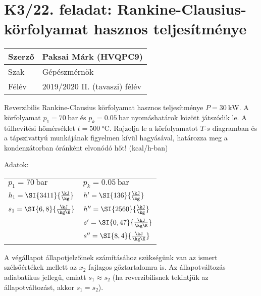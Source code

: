 \section*{K3/22. feladat: Rankine-Clausius-körfolyamat hasznos teljesítménye}


\begin{tabular}{ | p{2cm} | p{14cm} | } 
	\hline
	Szerző & Paksai Márk (HVQPC9)\\ 
	\hline
	Szak & Gépészmérnök \\ 
	\hline
	Félév & 2019/2020 II. (tavaszi) félév \\ 
	\hline
\end{tabular}
\vspace{0.5cm}

 Reverzibilis Rankine-Clausius körfolyamat hasznos teljesítménye $P = \SI{30}{\kW}$. A körfolyamat $p_1 = \SI{70}{\bar}$ és $p_k = \SI{0,05}{\bar}$ nyomáshatárok között játszódik le. A túlhevítési hőmérséklet $t = \SI{500}{\celsius}$. Rajzolja le a körfolyamatot $T$-$s$ diagramban és a tápszivattyú munkájának figyelmen kívül hagyásával, határozza meg a kondenzátorban óránként elvonódó hőt! (kcal/h-ban)\par
 \bigskip
 \noindent
 Adatok:
\begin{center}
	\begin{tabular}{ ll } 
		$p_1 = \SI{70}{\bar}$ & $p_k = \SI{0,05}{\bar}$\\ [2ex]
		$h_1 = \SI{3411}{\frac{\kJ}{\kg}}$ & $h' = \SI{136}{\frac{\kJ}{\kg}}$ \\[2ex] 	
		$s_1 = \SI{6,8}{\frac{\kJ}{\kg\K}}$ & $h'' = \SI{2560}{\frac{\kJ}{\kg}}$\\[2ex] 	
		& $s' = \SI{0,47}{\frac{\kJ}{\kg\K}}$ \\[2ex] 
		& $s'' = \SI{8,4}{\frac{\kJ}{\kg\K}}$\\[2ex]
	\end{tabular}
\end{center}
\bigskip

\noindent
A végállapot állapotjelzőinek számításához szükségünk van az ismert szélsőértékek mellett az $x_2$ fajlagos gőztartalomra is. Az állapotváltozás adiabatikus jellegű, emiatt $s_1 \approx s_2$ (ha reverzibilisnek tekintjük az állapotváltozást, akkor $s_1 = s_2$).

